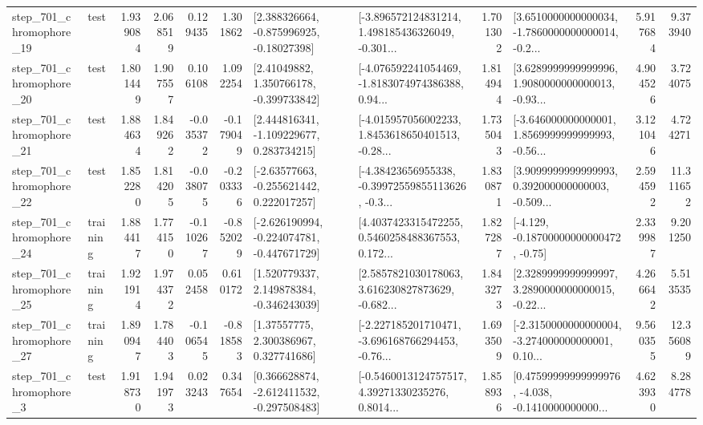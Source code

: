 \begin{tabular}{llrrrrllrlrr}
  step\_701\_chromophore\_19 &      test &      1.939084 &    2.068519 &      0.129435 &  1.301862 &    [2.388326664, -0.875996925, -0.18027398] &  [-3.896572124831214, 1.498185436326049, -0.301... &       1.701302 &  [3.6510000000000034, -1.7860000000000014, -0.2... &            5.917684 &          9.373940 \\
  step\_701\_chromophore\_20 &      test &      1.801449 &    1.907557 &      0.106108 &  1.092254 &     [2.41049882, 1.350766178, -0.399733842] &  [-4.076592241054469, -1.8183074974386388, 0.94... &       1.814944 &  [3.6289999999999996, 1.9080000000000013, -0.93... &            4.904526 &          3.724075 \\
  step\_701\_chromophore\_21 &      test &      1.884634 &    1.849262 &     -0.035372 & -0.179049 &    [2.444816341, -1.109229677, 0.283734215] &  [-4.015957056002233, 1.8453618650401513, -0.28... &       1.735043 &  [-3.646000000000001, 1.8569999999999993, -0.56... &            3.121046 &          4.724271 \\
  step\_701\_chromophore\_22 &      test &      1.852280 &    1.814205 &     -0.038075 & -0.203336 &    [-2.63577663, -0.255621442, 0.222017257] &  [-4.38423656955338, -0.39972559855113626, -0.3... &       1.830871 &  [3.9099999999999993, 0.392000000000003, -0.509... &            2.594592 &         11.311652 \\
  step\_701\_chromophore\_24 &  training &      1.884417 &    1.774150 &     -0.110267 & -0.852029 &  [-2.626190994, -0.224074781, -0.447671729] &  [4.4037423315472255, 0.5460258488367553, 0.172... &       1.827287 &              [-4.129, -0.18700000000000472, -0.75] &            2.339987 &          9.201250 \\
  step\_701\_chromophore\_25 &  training &      1.921914 &    1.974372 &      0.052458 &  0.610172 &    [1.520779337, 2.149878384, -0.346243039] &  [2.5857821030178063, 3.616230827873629, -0.682... &       1.843273 &  [2.3289999999999997, 3.2890000000000015, -0.22... &            4.266642 &          5.513535 \\
  step\_701\_chromophore\_27 &  training &      1.890947 &    1.784403 &     -0.106545 & -0.818583 &      [1.37557775, 2.300386967, 0.327741686] &  [-2.227185201710471, -3.696168766294453, -0.76... &       1.693509 &  [-2.3150000000000004, -3.274000000000001, 0.10... &            9.560355 &         12.356089 \\
   step\_701\_chromophore\_3 &      test &      1.918730 &    1.941973 &      0.023243 &  0.347654 &   [0.366628874, -2.612411532, -0.297508483] &  [-0.5460013124757517, 4.39271330235276, 0.8014... &       1.858936 &  [0.47599999999999976, -4.038, -0.1410000000000... &            4.623930 &          8.284778 \\

\end{tabular}
